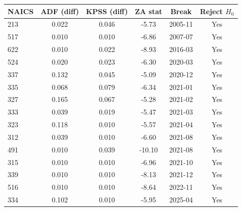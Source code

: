 {\footnotesize
\begin{tabular}{lccccc}
\toprule
NAICS & ADF (diff) & KPSS (diff) & ZA stat & Break & Reject $H_0$ \\
\midrule
213 & 0.022 & 0.046 & -5.73 & 2005-11 & Yes \\
517 & 0.010 & 0.010 & -6.86 & 2007-07 & Yes \\
622 & 0.010 & 0.022 & -8.93 & 2016-03 & Yes \\
524 & 0.020 & 0.023 & -6.30 & 2020-03 & Yes \\
337 & 0.132 & 0.045 & -5.09 & 2020-12 & Yes \\
335 & 0.068 & 0.079 & -6.34 & 2021-01 & Yes \\
327 & 0.165 & 0.067 & -5.28 & 2021-02 & Yes \\
333 & 0.039 & 0.019 & -5.47 & 2021-03 & Yes \\
323 & 0.118 & 0.010 & -5.57 & 2021-04 & Yes \\
312 & 0.039 & 0.010 & -6.60 & 2021-08 & Yes \\
491 & 0.010 & 0.039 & -10.10 & 2021-08 & Yes \\
315 & 0.010 & 0.010 & -6.96 & 2021-10 & Yes \\
339 & 0.010 & 0.010 & -8.13 & 2021-12 & Yes \\
516 & 0.010 & 0.010 & -8.64 & 2022-11 & Yes \\
334 & 0.102 & 0.010 & -5.95 & 2025-04 & Yes \\
\bottomrule
\end{tabular}
}
